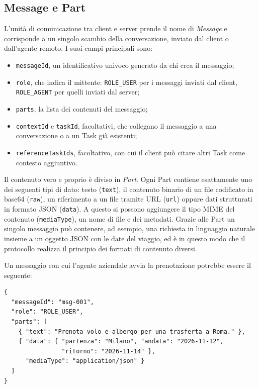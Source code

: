\FloatBarrier

\subsection{Message e Part}

L'unità di comunicazione tra client e server prende il nome di \emph{Message} e corrisponde a un singolo scambio della conversazione, inviato dal client o 
dall'agente remoto. I suoi campi principali sono:

\begin{itemize}
    \item \texttt{messageId}, un identificativo univoco generato da chi crea il messaggio;
    \item \texttt{role}, che indica il mittente: \texttt{ROLE\_USER} per i messaggi inviati dal client, \texttt{ROLE\_AGENT} per quelli inviati dal server;
    \item \texttt{parts}, la lista dei contenuti del messaggio;
    \item \texttt{contextId} e \texttt{taskId}, facoltativi, che collegano il messaggio a una conversazione o a un Task già esistenti;
    \item \texttt{reference\allowbreak Task\allowbreak Ids}, facoltativo, con cui il client può citare altri Task come contesto aggiuntivo.
\end{itemize}

Il contenuto vero e proprio è diviso in \emph{Part}. Ogni Part contiene esattamente uno dei seguenti tipi di dato: testo (\texttt{text}), il contenuto binario
di un file codificato in base64 (\texttt{raw}), un riferimento a un file tramite URL (\texttt{url}) oppure dati strutturati in formato JSON (\texttt{data}). A 
questo si possono aggiungere il tipo MIME del contenuto (\texttt{mediaType}), un nome di file e dei metadati. Grazie alle Part un singolo messaggio può contenere, 
ad esempio, una richiesta in linguaggio naturale insieme a un oggetto JSON con le date del viaggio, ed è in questo modo che il protocollo realizza il principio dei formati di contenuto diversi.

Un messaggio con cui l'agente aziendale avvia la prenotazione potrebbe essere il seguente:

\begin{center}
\begin{minipage}{0.95\linewidth}
\footnotesize
\begin{verbatim}
{
  "messageId": "msg-001",
  "role": "ROLE_USER",
  "parts": [
    { "text": "Prenota volo e albergo per una trasferta a Roma." },
    { "data": { "partenza": "Milano", "andata": "2026-11-12",
                "ritorno": "2026-11-14" },
      "mediaType": "application/json" }
  ]
}
\end{verbatim}
\end{minipage}
\end{center}

